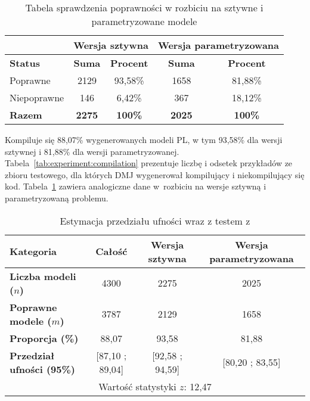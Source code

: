 \begin{table}[H]
\caption{Tabela sprawdzenia poprawności w rozbiciu na sztywne i parametryzowane modele}\label{tab:experiment:compilation:breakdown}
\centering%
\begin{tabular}{|l|c|c|c|c|}
\hline%
	&\multicolumn{2}{c|}{Wersja sztywna}&\multicolumn{2}{c|}{Wersja parametryzowana}\\
\hline
\textbf{Status} & \textbf{Suma} & \textbf{Procent} & \textbf{Suma} & \textbf{Procent} \\
\hline
Poprawne & 2129 & 93,58\% & 1658 & 81,88\% \\
\hline
Niepoprawne & 146 & 6,42\% & 367 & 18,12\%\\
\hline
\textbf{Razem} & \textbf{2275} & \textbf{100\%} &\textbf{2025} & \textbf{100\%} \\
\hline
\end{tabular}
\end{table}

Kompiluje się 88,07\% wygenerowanych modeli PL, w tym 93,58\% dla wersji sztywnej i 81,88\% dla wersji parametryzowanej. Tabela~\ref{tab:experiment:compilation} prezentuje liczbę i odsetek przykładów ze zbioru testowego, dla których DMJ wygenerował kompilujący i niekompilujący się kod. Tabela~\ref{tab:experiment:compilation:breakdown} zawiera analogiczne dane w~rozbiciu na wersje sztywną i parametryzowaną problemu.

\begin{table}[H]
\caption{Estymacja przedziału ufności  wraz z testem z}\label{tab:experiment:analysis1}
\centering%
\begin{tabular}{|l|c|c|c|}
\hline
\textbf{Kategoria} & \textbf{Całość} & \textbf{Wersja sztywna} & \textbf{Wersja parametryzowana} \\
\hline
\textbf{Liczba modeli ($n$)} & 4300 & 2275 & 2025 \\
\hline
\textbf{Poprawne modele ($m$)} & 3787 & 2129 & 1658 \\
\hline
\textbf{Proporcja (\%)} & 88,07 & 93,58 & 81,88 \\
\hline
\textbf{Przedział ufności (95\%)} & [87,10 ; 89,04] & [92,58 ; 94,59] & [80,20 ; 83,55] \\
\hline
\multicolumn{4}{|c|}{Wartość statystyki \( z \): 12,47}\\
\hline
\end{tabular}
\end{table}

